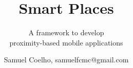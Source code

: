 \documentclass{./llncs2e/llncs}
\begin{document}
\title{Smart Places}

\subtitle{A framework to develop \\ proximity-based mobile applications}
\author{Samuel Coelho, samuelfcmc@gmail.com}

\maketitle

\setcounter{tocdepth}{2}
\makeatletter
\renewcommand*\l@author[2]{}
\renewcommand*\l@title[2]{}
\makeatletter

\tableofcontents

\newpage








\appendix


%
%



\end{document}
